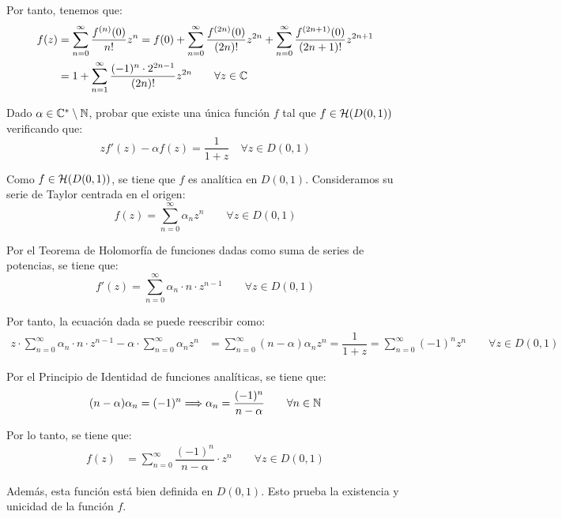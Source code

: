 \begin{ejercicio}
\begin{enumerate}
        Por tanto, tenemos que:
        \begin{align*}
            f(z) &= \sum_{n=0}^{\infty} \dfrac{f^{(n)}(0)}{n!}z^n
            = f(0) + \sum_{n=0}^{\infty} \dfrac{f^{(2n)}(0)}{(2n)!}z^{2n} + \sum_{n=0}^{\infty} \dfrac{f^{(2n+1)}(0)}{(2n+1)!}z^{2n+1}\\
            &= 1+\sum_{n=1}^{\infty} \dfrac{(-1)^{n}\cdot 2^{2n-1}}{(2n)!}z^{2n}\qquad \forall z \in \mathbb{C}
        \end{align*}
    \end{enumerate}
\end{ejercicio}

\begin{ejercicio}
    Dado $\alpha \in \mathbb{C}^*\setminus \mathbb{N}$, probar que existe una única función $f$ tal que $f \in \mathcal{H}(D(0,1))$ verificando que:
    \begin{equation*}
        z f'(z) - \alpha f(z) = \frac{1}{1+z} \quad \forall z \in D(0,1)
    \end{equation*}

    Como $f\in \mathcal{H}(D(0,1))$, se tiene que $f$ es analítica en $D(0,1)$. Consideramos su serie de Taylor centrada en el origen:
    \begin{equation*}
        f(z) = \sum_{n=0}^{\infty} \alpha_n z^n \qquad \forall z \in D(0,1)
    \end{equation*}

    Por el Teorema de Holomorfía de funciones dadas como suma de series de potencias, se tiene que:
    \begin{equation*}
        f'(z) = \sum_{n=0}^{\infty} \alpha_n\cdot n\cdot z^{n-1} \qquad \forall z \in D(0,1)
    \end{equation*}

    Por tanto, la ecuación dada se puede reescribir como:
    \begin{align*}
        z\cdot \sum_{n=0}^{\infty} \alpha_n\cdot n\cdot z^{n-1} - \alpha\cdot \sum_{n=0}^{\infty} \alpha_n z^n &= \sum_{n=0}^{\infty} (n-\alpha)\alpha_n z^n
        = \dfrac{1}{1+z}=\sum_{n=0}^{\infty} (-1)^n z^n \qquad \forall z \in D(0,1)
    \end{align*}

    Por el Principio de Identidad de funciones analíticas, se tiene que:
    \begin{equation*}
        (n-\alpha)\alpha_n = (-1)^n\Longrightarrow
        \alpha_n = \frac{(-1)^n}{n-\alpha} \qquad \forall n \in \mathbb{N}
    \end{equation*}

    Por lo tanto, se tiene que:
    \begin{align*}
        f(z) &= \sum_{n=0}^{\infty}\dfrac{(-1)^n}{n-\alpha}\cdot z^n\qquad \forall z \in D(0,1)
    \end{align*}

    Además, esta función está bien definida en $D(0,1)$. Esto prueba la existencia y unicidad de la función $f$.    
\end{ejercicio}

